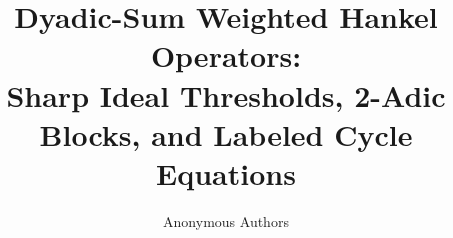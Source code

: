 \documentclass[11pt,a4paper]{article}
\title{Dyadic-Sum Weighted Hankel Operators:\\
Sharp Ideal Thresholds, 2-Adic Blocks, and Labeled Cycle Equations}
\author{Anonymous Authors}
\date{}
\begin{document}
\maketitle

\begin{abstract}

\end{abstract}













\clearpage
\appendix




\end{document}
